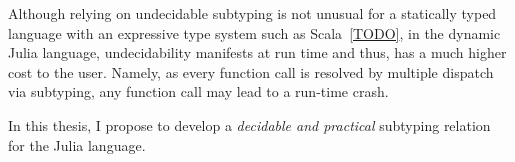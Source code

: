 Although relying on undecidable subtyping is not unusual
for a statically typed language
with an expressive type system such as Scala~\ref{TODO},
in the dynamic Julia language, undecidability manifests at run time and thus,
has a much higher cost to the user.
Namely, as every function call is resolved by multiple dispatch via subtyping,
any function call may lead to a run-time crash.



In this thesis, I propose to develop
a \emph{decidable and practical} subtyping relation for the Julia language.

%



